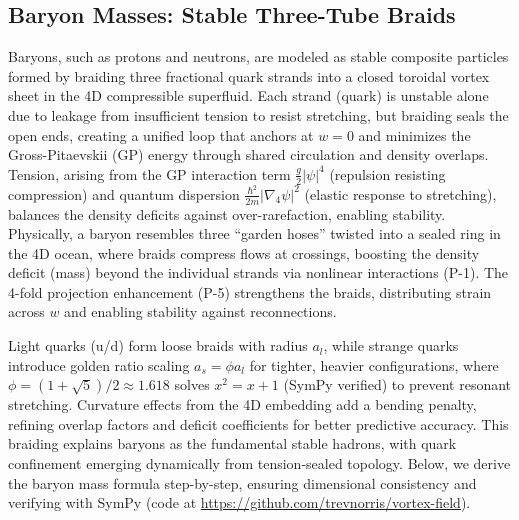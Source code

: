 
\subsection{Baryon Masses: Stable Three-Tube Braids}

Baryons, such as protons and neutrons, are modeled as stable composite particles formed by braiding three fractional quark strands into a closed toroidal vortex sheet in the 4D compressible superfluid. Each strand (quark) is unstable alone due to leakage from insufficient tension to resist stretching, but braiding seals the open ends, creating a unified loop that anchors at $w=0$ and minimizes the Gross-Pitaevskii (GP) energy through shared circulation and density overlaps. Tension, arising from the GP interaction term $\frac{g}{2} |\psi|^4$ (repulsion resisting compression) and quantum dispersion $\frac{\hbar^2}{2m} |\nabla_4 \psi|^2$ (elastic response to stretching), balances the density deficits against over-rarefaction, enabling stability. Physically, a baryon resembles three ``garden hoses'' twisted into a sealed ring in the 4D ocean, where braids compress flows at crossings, boosting the density deficit (mass) beyond the individual strands via nonlinear interactions (P-1). The 4-fold projection enhancement (P-5) strengthens the braids, distributing strain across $w$ and enabling stability against reconnections.

Light quarks (u/d) form loose braids with radius $a_l$, while strange quarks introduce golden ratio scaling $a_s = \phi a_l$ for tighter, heavier configurations, where $\phi = (1 + \sqrt{5})/2 \approx 1.618$ solves $x^2 = x + 1$ (SymPy verified) to prevent resonant stretching. Curvature effects from the 4D embedding add a bending penalty, refining overlap factors and deficit coefficients for better predictive accuracy. This braiding explains baryons as the fundamental stable hadrons, with quark confinement emerging dynamically from tension-sealed topology. Below, we derive the baryon mass formula step-by-step, ensuring dimensional consistency and verifying with SymPy (code at \url{https://github.com/trevnorris/vortex-field}).

